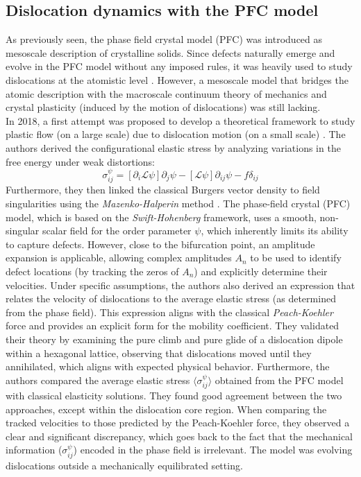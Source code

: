 \documentclass[11pt]{article}
\begin{document}
\subsection{Dislocation dynamics with the PFC model}
As previously seen, the phase field crystal model (PFC) was introduced as mesoscale description of crystalline solids. Since defects naturally emerge and evolve in the PFC model without any imposed rules, it was heavily used to study dislocations at the atomistic level \parencite{berryDiffusiveatomistic2006}\parencite{elderPhasefieldcrystal2007a}\parencite{chanPlasticityDislocation2010}. However, a mesoscale model that bridges the atomic description with the macroscale continuum theory of mechanics and crystal plasticity (induced by the motion of dislocations) was still lacking.\\
In 2018, a first attempt was proposed to develop a theoretical framework to study plastic flow (on a large scale) due to dislocation motion (on a small scale) \parencite{skaugenDislocationdynamics2018}. The authors derived the configurational elastic stress by analyzing variations in the free energy under weak distortions:
\begin{equation}
    \sigma_{ij}^\psi = [\partial_i \mathcal{L} \psi] \partial_j \psi - [\mathcal{L}\psi]\partial_{ij} \psi -f \delta_{ij}
\end{equation}
Furthermore, they then linked the classical Burgers vector density to field singularities using the \emph{Mazenko-Halperin} method \parencite{Halperin1981}\parencite{mazenkoVortexVelocities1997}. The phase-field crystal (PFC) model, which is based on the \emph{Swift-Hohenberg} framework, uses a smooth, non-singular scalar field for the order parameter $\psi$, which inherently limits its ability to capture defects. However, close to the bifurcation point, an amplitude expansion is applicable, allowing complex amplitudes $A_n$ to be used to identify defect locations (by tracking the zeros of $A_n$) and explicitly determine their velocities. Under specific assumptions, the authors also derived an expression that relates the velocity of dislocations to the average elastic stress (as determined from the phase field)\parencite{skaugenDislocationdynamics2018}. This expression aligns with the classical \emph{Peach-Koehler} force and provides an explicit form for the mobility coefficient. They validated their theory by examining the pure climb and pure glide of a dislocation dipole within a hexagonal lattice, observing that dislocations moved until they annihilated, which aligns with expected physical behavior. Furthermore, the authors compared the average elastic stress $\langle \sigma^{\psi}_{ij}\rangle$ obtained from the PFC model with classical elasticity solutions. They found good agreement between the two approaches, except within the dislocation core region. When comparing the tracked velocities to those predicted by the Peach-Koehler force, they observed a clear and significant discrepancy, which goes back to the fact that the mechanical information ($\sigma_{ij}^\psi$) encoded in the phase field is irrelevant. The model was evolving dislocations outside a mechanically equilibrated setting.\\
\end{document}
